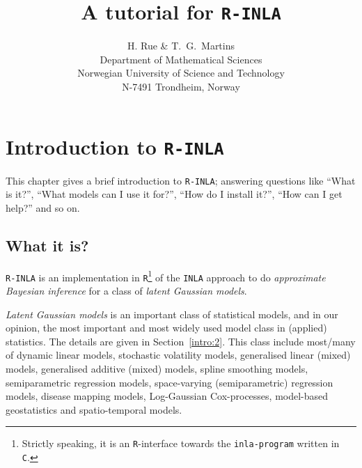 \documentclass[a4paper,11pt]{report}
\newcommand{\tv}{\texttt}
\def\Sec#1{Section~\ref{#1}}
\begin{document}


\title{A tutorial for \tv{R-INLA}}
\author{H. Rue \& T.\ G.\ Martins\\
 Department of Mathematical Sciences\\
 Norwegian University of Science and Technology\\
 N-7491 Trondheim, Norway}
\maketitle



\chapter{Introduction to \tv{R-INLA}}
\label{intro:0}

This chapter gives a brief introduction to \tv{R-INLA}; answering
questions like ``What is it?'', ``What models can I use it for?'',
``How do I install it?'', ``How can I get help?'' and so on.

\section{What it is?}
\label{intro:1}

\tv{R-INLA} is an implementation in \tv{R}\footnote{Strictly speaking,
    it is an \tv{R}-interface towards the \tv{inla-program} written in
    \tv{C}.} of the \tv{INLA} approach to do \emph{approximate
    Bayesian inference} for a class of \emph{latent Gaussian models}.

\emph{Latent Gaussian models} is an important class of statistical
models, and in our opinion, the most important and most widely used
model class in (applied) statistics. The details are given in
\Sec{intro:2}. This class include most/many of dynamic linear models,
stochastic volatility models, generalised linear (mixed) models,
generalised additive (mixed) models, spline smoothing models,
semiparametric regression models, space-varying (semiparametric)
regression models, disease mapping models, Log-Gaussian Cox-processes,
model-based geostatistics and spatio-temporal models.
\end{document}
